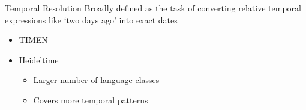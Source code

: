 \begin{frame}{Temporal Resolution}
Broadly defined as the task of converting relative temporal expressions like `two days ago' into exact dates
\begin{itemize}
    \item TIMEN~\cite{timen}
    \item Heideltime~\cite{heideltime}
        \begin{itemize}
            \item Larger number of language classes
            \item Covers more temporal patterns
        \end{itemize}
\end{itemize}
\end{frame}








